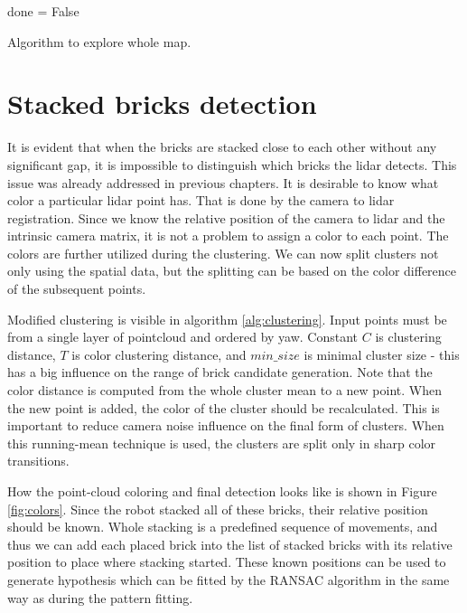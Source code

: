 \begin{algorithm}[H]
	done = False\;
	\caption{Algorithm to explore whole map.}
	\label{alg:exploration}
\end{algorithm}

\section{Stacked bricks detection}
It is evident that when the bricks are stacked close to each other without any significant gap, it is impossible to distinguish which bricks the lidar detects. This issue was already addressed in previous chapters. It is desirable to know what color a particular lidar point has. That is done by the camera to lidar registration. Since we know the relative position of the camera to lidar and the intrinsic camera matrix, it is not a problem to assign a color to each point. The colors are further utilized during the clustering. We can now split clusters not only using the spatial data, but the splitting can be based on the color difference of the subsequent points. 

Modified clustering is visible in algorithm \ref{alg:clustering}. Input points must be from a single layer of pointcloud and ordered by yaw. Constant $C$ is clustering distance, $T$ is color clustering distance, and $min\_size$ is minimal cluster size - this has a big influence on the range of brick candidate generation. Note that the color distance is computed from the whole cluster mean to a new point. When the new point is added, the color of the cluster should be recalculated. This is important to reduce camera noise influence on the final form of clusters. When this running-mean technique is used, the clusters are split only in sharp color transitions. 

How the point-cloud coloring and final detection looks like is shown in Figure  \ref{fig:colors}. Since the robot stacked all of these bricks, their relative position should be known. Whole stacking is a predefined sequence of movements, and thus we can add each placed brick into the list of stacked bricks with its relative position to place where stacking started. These known positions can be used to generate hypothesis which can be fitted by the RANSAC algorithm in the same way as during the pattern fitting. 

